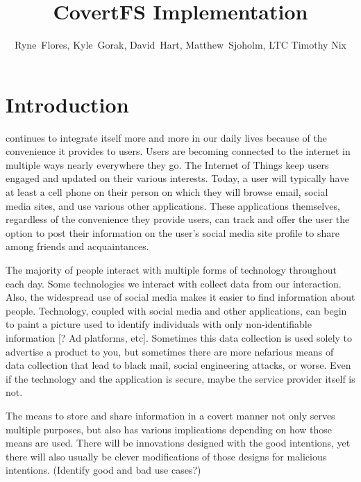 \documentclass[12pt,journal,compsoc]{IEEEtran}
\title{CovertFS Implementation}
\author{Ryne~Flores, Kyle~Gorak, David~Hart, Matthew~Sjoholm, LTC Timothy Nix \\ \IEEEmembership{Department of Electrical Engineering and Computer Science\\ United States Military Academy}}
\date{}
\begin{document}
\maketitle

\section{Introduction}


 continues to integrate itself more and more in our daily lives because of the convenience it provides to users. Users are becoming connected to the internet in multiple ways nearly everywhere they go. The Internet of Things keep users engaged and updated on their various interests. Today, a user will typically have at least a cell phone on their person on which they will browse email, social media sites, and use various other applications. These applications themselves, regardless of the convenience they provide users, can track and offer the user the option to post their information on the user's social media site profile to share among friends and acquaintances.

The majority of people interact with multiple forms of technology throughout each day. Some technologies we interact with collect data from our interaction. Also, the widespread use of social media makes it easier to find information about people. Technology, coupled with social media and other applications, can begin to paint a picture used to identify individuals with only non-identifiable information [? Ad platforms, etc]. Sometimes this data collection is used solely to advertise a product to you, but sometimes there are more nefarious means of data collection that lead to black mail, social engineering attacks, or worse. Even if the technology and the application is secure, maybe the service provider itself is not\cite{Baliga2007}.

The means to store and share information in a covert manner not only serves multiple purposes, but also has various implications depending on how those means are used. There will be innovations designed with the good intentions, yet there will also usually be clever modifications of those designs for malicious intentions. (Identify good and bad use cases?)
\end{document}
